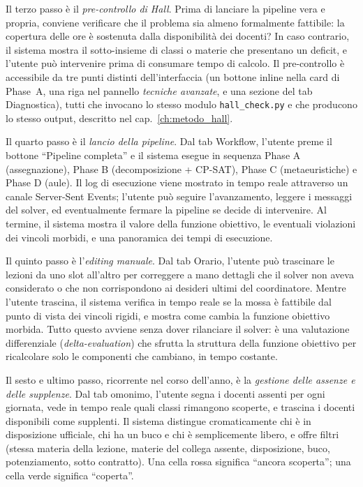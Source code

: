 Il terzo passo \`e il \emph{pre-controllo di Hall}. Prima di
lanciare la pipeline vera e propria, conviene verificare che
il problema sia almeno formalmente fattibile: la copertura
delle ore \`e sostenuta dalla disponibilit\`a dei docenti? In
caso contrario, il sistema mostra il sotto-insieme di classi
o materie che presentano un deficit, e l'utente pu\`o
intervenire prima di consumare tempo di calcolo. Il
pre-controllo \`e accessibile da tre punti distinti
dell'interfaccia (un bottone inline nella card di Phase~A,
una riga nel pannello \emph{tecniche avanzate}, e una sezione
del tab Diagnostica), tutti che invocano lo stesso modulo
\texttt{hall\_check.py} e che producono lo stesso output,
descritto nel cap.~\ref{ch:metodo_hall}.

Il quarto passo \`e il \emph{lancio della pipeline}. Dal tab
Workflow, l'utente preme il bottone ``Pipeline completa'' e il
sistema esegue in sequenza Phase A (assegnazione), Phase B
(decomposizione + CP-SAT), Phase C (metaeuristiche) e Phase D
(aule). Il log di esecuzione viene mostrato in tempo reale
attraverso un canale Server-Sent Events; l'utente pu\`o
seguire l'avanzamento, leggere i messaggi del solver, ed
eventualmente fermare la pipeline se decide di intervenire.
Al termine, il sistema mostra il valore della funzione
obiettivo, le eventuali violazioni dei vincoli morbidi, e una
panoramica dei tempi di esecuzione.

Il quinto passo \`e l'\emph{editing manuale}. Dal tab Orario,
l'utente pu\`o trascinare le lezioni da uno slot all'altro per
correggere a mano dettagli che il solver non aveva considerato
o che non corrispondono ai desideri ultimi del coordinatore.
Mentre l'utente trascina, il sistema verifica in tempo reale
se la mossa \`e fattibile dal punto di vista dei vincoli
rigidi, e mostra come cambia la funzione obiettivo morbida.
Tutto questo avviene senza dover rilanciare il solver: \`e una
valutazione differenziale (\emph{delta-evaluation}) che
sfrutta la struttura della funzione obiettivo per ricalcolare
solo le componenti che cambiano, in tempo costante.

Il sesto e ultimo passo, ricorrente nel corso dell'anno, \`e
la \emph{gestione delle assenze e delle supplenze}. Dal tab
omonimo, l'utente segna i docenti assenti per ogni giornata,
vede in tempo reale quali classi rimangono scoperte, e
trascina i docenti disponibili come supplenti. Il sistema
distingue cromaticamente chi \`e in disposizione ufficiale,
chi ha un buco e chi \`e semplicemente libero, e offre
filtri (stessa materia della lezione, materie del collega
assente, disposizione, buco, potenziamento, sotto
contratto). Una cella rossa significa ``ancora scoperta'';
una cella verde significa ``coperta''.


